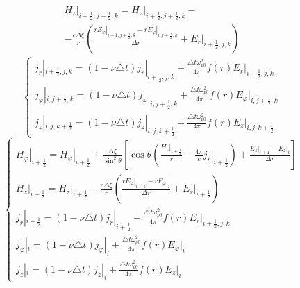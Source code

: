 \documentclass[a4paper]{article}
\begin{document}
	\begin{multline*}
		\left.H_{z}\right|_{i+\frac{1}{2},j+\frac{1}{2},k}=\left.H_{z}\right|_{i+\frac{1}{2},j+\frac{1}{2},k}-\\
		-\frac{c\Delta\xi}{r}\left(\frac{\left.rE_{\varphi}\right|_{i+1,j+\frac{1}{2},k}-\left.rE_{\varphi}\right|_{i,j+\frac{1}{2},k}}{\Delta r}+\left.E_{r}\right|_{i+\frac{1}{2},j,k}\right)
	\end{multline*}
	\begin{equation*}
		\begin{cases*}
			j_{r}|_{i+\frac{1}{2},j,k}=(1-\nu\triangle t) j_{r}|_{i+\frac{1}{2},j,k}+\frac{\triangle t\omega_{p0}^{2}}{4\pi} f(r)E_r|_{i+\frac{1}{2},j,k}\\
			j_{\varphi}|_{i,j+\frac{1}{2},k}=(1-\nu\triangle t) j_{\varphi}|_{i,j+\frac{1}{2},k}+\frac{\triangle t\omega_{p0}^{2}}{4\pi}f(r)E_{\varphi}|_{i,j+\frac{1}{2},k}\\
			j_{z}|_{i,j,k+\frac{1}{2}}=(1-\nu\triangle t) j_{z}|_{i,j,k+\frac{1}{2}}+\frac{\triangle t\omega_{p0}^{2}}{4\pi}f(r)E_{z}|_{i,j,k+\frac{1}{2}}
		\end{cases*}
	\end{equation*}
	\begin{equation*}
		\begin{cases*}
			\left.H_{\varphi}\right|_{i+\frac{1}{2}}=\left.H_{\varphi}\right|_{i+\frac{1}{2}}+\frac{\Delta\xi}{\sin^{2}\theta}\left[\cos\theta\left(\frac{\left.H_{z}\right|_{i+\frac{1}{2}}}{r}-\frac{4\pi}{c}\left.j_{r}\right|_{i+\frac{1}{2}}\right)+\frac{\left.E_{z}\right|_{i+1}-\left.E_{z}\right|_{i}}{\Delta r}\right]\\
			\left.H_{z}\right|_{i+\frac{1}{2}}=\left.H_{z}\right|_{i+\frac{1}{2}}-\frac{c\Delta\xi}{r}\left(\frac{\left.rE_{\varphi}\right|_{i+1}-\left.rE_{\varphi}\right|_{i}}{\Delta r}+\left.E_{r}\right|_{i+\frac{1}{2}}\right)\\
			j_{r}|_{i+\frac{1}{2}}=(1-\nu\triangle t) j_{r}|_{i+\frac{1}{2}}+\frac{\triangle t\omega_{p0}^{2}}{4\pi} f(r)E_r|_{i+\frac{1}{2},j,k}\\
			j_{\varphi}|_{i}=(1-\nu\triangle t) j_{\varphi}|_{i}+\frac{\triangle t\omega_{p0}^{2}}{4\pi}f(r)E_{\varphi}|_{i}\\
			j_{z}|_{i}=(1-\nu\triangle t) j_{z}|_{i}+\frac{\triangle t\omega_{p0}^{2}}{4\pi}f(r)E_{z}|_{i}
		\end{cases*}
	\end{equation*}
%		
%		
%		
\end{document}
